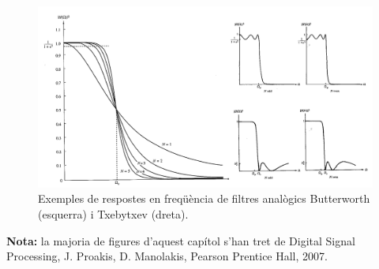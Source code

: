 \documentclass{article}
\begin{document}
\begin{figure}[htbp]
\begin{center}
\includegraphics[width=12cm]{ButtTxeby.png}
\end{center}
\caption{Exemples de respostes en freqüència de filtres analògics Butterworth (esquerra) i Txebytxev (dreta).}
\label{ButtTxeby}
\end{figure}


\vskip 7cm
\noindent
\textbf{Nota:} la majoria de figures d'aquest cap\'itol s'han tret de Digital Signal Processing, J. Proakis, D. Manolakis, Pearson Prentice Hall, 2007.
\end{document}
